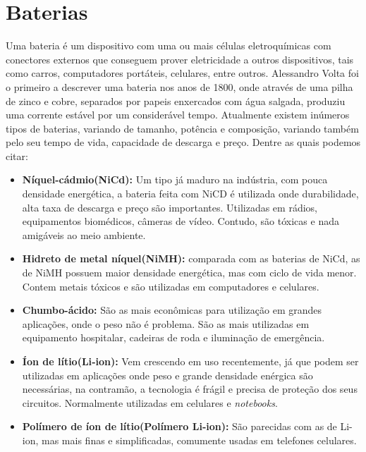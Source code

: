 \section{Baterias}


Uma bateria é um dispositivo com uma ou mais células eletroquímicas com conectores externos que conseguem prover eletricidade a outros dispositivos, tais como carros, computadores portáteis, celulares, entre outros. Alessandro Volta foi o primeiro a descrever uma bateria nos anos de 1800, onde através de uma pilha de zinco e cobre, separados por papeis enxercados com água salgada, produziu uma corrente estável por um considerável tempo. Atualmente existem inúmeros tipos de baterias, variando de tamanho, potência e composição, variando também pelo seu tempo de vida, capacidade de descarga e preço\cite{Buchmann2017}. Dentre as quais podemos citar:
\begin{itemize}
    \item \textbf{Níquel-cádmio(NiCd):} Um tipo já maduro na indústria, com pouca densidade energética, a bateria feita com NiCD é utilizada onde durabilidade, alta taxa de descarga e preço são importantes. Utilizadas em rádios, equipamentos biomédicos, câmeras de vídeo. Contudo, são tóxicas e nada amigáveis ao meio ambiente.
    \item \textbf{Hidreto de metal níquel(NiMH):} comparada com as baterias de NiCd, as de NiMH possuem maior densidade energética, mas com ciclo de vida menor. Contem metais tóxicos e são utilizadas em computadores e celulares.
    \item \textbf{Chumbo-ácido:} São as mais econômicas para utilização em grandes aplicações, onde o peso não é problema. São as mais utilizadas em equipamento hospitalar, cadeiras de roda e iluminação de emergência.
    \item \textbf{Íon de lítio(Li‑ion):} Vem crescendo em uso recentemente, já que podem ser utilizadas em aplicações onde peso e grande densidade enérgica são necessárias, na contramão, a tecnologia é frágil e precisa de proteção dos seus circuitos. Normalmente utilizadas em celulares e \textit{notebooks}.
    \item \textbf{Polímero de íon de lítio(Polímero Li‑ion): } São parecidas com as de Li-ion, mas mais finas e simplificadas, comumente usadas em telefones celulares.
\end{itemize}
